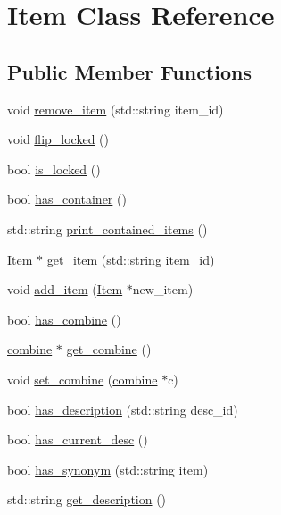\hypertarget{class_item}{
\section{\-Item \-Class \-Reference}
\label{class_item}
}
\subsection*{\-Public \-Member \-Functions}
\begin{DoxyCompactItemize}
\item 
void \hyperlink{class_item_a47edaf75180ff10fe40144de345fdab3}{remove\-\_\-item} (std\-::string item\-\_\-id)
\item 
void \hyperlink{class_item_acb7d4c776f5ead3203d80e53b5bdc72a}{flip\-\_\-locked} ()
\item 
bool \hyperlink{class_item_a2618bb10b850279603a202e7480f0b78}{is\-\_\-locked} ()
\item 
bool \hyperlink{class_item_aa2b2218512e8d1735043a95dfc30c719}{has\-\_\-container} ()
\item 
std\-::string \hyperlink{class_item_aeacd2dfc86786b52c8362f9551e75b51}{print\-\_\-contained\-\_\-items} ()
\item 
\hyperlink{class_item}{\-Item} $\ast$ \hyperlink{class_item_a27bb6d69a3c174f6c1815d9ed8ac6fde}{get\-\_\-item} (std\-::string item\-\_\-id)
\item 
void \hyperlink{class_item_ab65ff31499eefb2b32c6d26712295396}{add\-\_\-item} (\hyperlink{class_item}{\-Item} $\ast$new\-\_\-item)
\item 
bool \hyperlink{class_item_a8789a6edd90c43516317f414adba3797}{has\-\_\-combine} ()
\item 
\hyperlink{classcombine}{combine} $\ast$ \hyperlink{class_item_a51176c036075d9d01da030a32911acea}{get\-\_\-combine} ()
\item 
void \hyperlink{class_item_a183a0ec19bfd51e8af5f24d57880ccd1}{set\-\_\-combine} (\hyperlink{classcombine}{combine} $\ast$c)
\item 
bool \hyperlink{class_item_a75f9cdba85ba1ce65b4ff71073ba8387}{has\-\_\-description} (std\-::string desc\-\_\-id)
\item 
bool \hyperlink{class_item_a703702e1992a45ac32beb2eb0e3e38bf}{has\-\_\-current\-\_\-desc} ()
\item 
bool \hyperlink{class_item_a7cf164e34fe584a29aa56dfb73933452}{has\-\_\-synonym} (std\-::string item)
\item 
std\-::string \hyperlink{class_item_a8652cab970af5b7ff68bf960a4e98fa2}{get\-\_\-description} ()

\end{DoxyCompactItemize}
